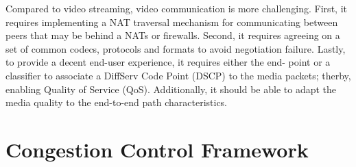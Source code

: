 
Compared to video streaming, video communication is more challenging. First,
it requires implementing a NAT traversal mechanism for communicating between
peers that may be behind a NATs or firewalls. Second, it requires agreeing on
a set of common codecs, protocols and formats to avoid negotiation failure.
Lastly, to provide  a decent end-user experience, it requires either the end-
point or a classifier to associate a DiffServ Code Point (DSCP) to the media
packets; therby, enabling Quality of Service (QoS). Additionally, it should be
able to adapt the media quality to the end-to-end path characteristics.

\section{Congestion Control Framework}
